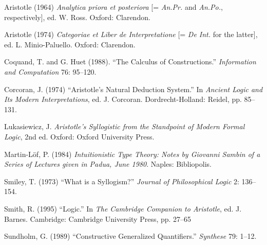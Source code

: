 \documentclass{article}
\def\AnPr/{\emph{An.Pr.}}
\def\AnPo/{\emph{An.Po.}}
\def\DeInterp/{\emph{De Int.}}
\begin{document}
\newpage

\begin{thebibliography}{99}

  Aristotle (1964)
  \emph{Analytica priora et posteriora} [= \AnPr/ and \AnPo/, respectively],
  ed. W. Ross.
  Oxford: Clarendon.

  Aristotle (1974)
  \emph{Categoriae et Liber de Interpretatione} [= \DeInterp/ for the latter],
  ed. L. Minio-Paluello.
  Oxford: Clarendon.

  Coquand, T. and G. Huet (1988).
  ``The Calculus of Constructions.'' 
  \emph{Information and Computation} 76: 95--120.

  Corcoran, J. (1974)
  ``Aristotle's Natural Deduction System.''
  In \emph{Ancient Logic and Its Modern Interpretations}, ed. J. Corcoran.
  Dordrecht-Holland: Reidel, pp. 85--131.

  Lukasiewicz, J.
  \emph{Aristotle's Syllogistic from the Standpoint of Modern Formal Logic}, 2nd ed.
  Oxford: Oxford University Press.

  Martin-L\"of, P. (1984)
  \emph{Intuitionistic Type Theory: Notes by Giovanni Sambin of a Series of Lectures given in Padua, June 1980}.
  Naples: Bibliopolis.

  Smiley, T. (1973)
  ``What is a Syllogism?''
  \emph{Journal of Philosophical Logic} 2: 136--154.

  Smith, R. (1995)
  ``Logic.'' 
  In \emph{The Cambridge Companion to Aristotle}, ed. J. Barnes.
  Cambridge: Cambridge University Press, pp. 27--65

  Sundholm, G. (1989)
  ``Constructive Generalized Quantifiers.''
  \emph{Synthese} 79: 1--12.

\end{thebibliography}
\end{document}
